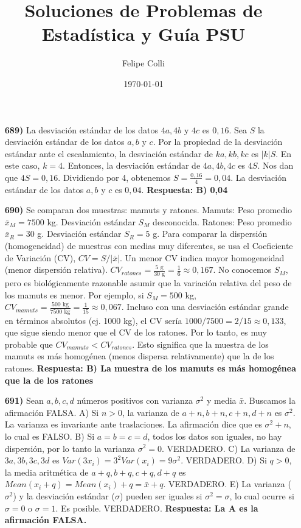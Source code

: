 \documentclass[12pt, a4paper]{article} %
\title{Soluciones de Problemas de Estadística y Guía PSU} %
\date{\today}
\author{Felipe Colli} %
\begin{document}
\maketitle

\begin{enumerate}
    \item[\bfseries 689)] La desviación estándar de los datos $4a, 4b$ y $4c$ es $0,16$. Sea $S$ la desviación estándar de los datos $a, b$ y $c$.
    Por la propiedad de la desviación estándar ante el escalamiento, la desviación estándar de $ka, kb, kc$ es $|k|S$.
    En este caso, $k=4$. Entonces, la desviación estándar de $4a, 4b, 4c$ es $4S$.
    Nos dan que $4S = 0,16$.
    Dividiendo por 4, obtenemos $S = \frac{0,16}{4} = 0,04$.
    La desviación estándar de los datos $a, b$ y $c$ es $0,04$.
    \textbf{Respuesta: B) 0,04}

    \item[\bfseries 690)] Se comparan dos muestras: mamuts y ratones.
    Mamuts: Peso promedio $\bar{x}_M = 7500$ kg. Desviación estándar $S_M$ desconocida.
    Ratones: Peso promedio $\bar{x}_R = 30$ g. Desviación estándar $S_R = 5$ g.
    Para comparar la dispersión (homogeneidad) de muestras con medias muy diferentes, se usa el Coeficiente de Variación (CV), $CV = S / |\bar{x}|$. Un menor CV indica mayor homogeneidad (menor dispersión relativa).
    $CV_{ratones} = \frac{5 \text{ g}}{30 \text{ g}} = \frac{1}{6} \approx 0,167$.
    No conocemos $S_M$, pero es biológicamente razonable asumir que la variación relativa del peso de los mamuts es menor. Por ejemplo, si $S_M = 500$ kg, $CV_{mamuts} = \frac{500 \text{ kg}}{7500 \text{ kg}} = \frac{1}{15} \approx 0,067$.
    Incluso con una desviación estándar grande en términos absolutos (ej. 1000 kg), el CV sería $1000/7500 = 2/15 \approx 0,133$, que sigue siendo menor que el CV de los ratones.
    Por lo tanto, es muy probable que $CV_{mamuts} < CV_{ratones}$. Esto significa que la muestra de los mamuts es más homogénea (menos dispersa relativamente) que la de los ratones.
    \textbf{Respuesta: B) La muestra de los mamuts es más homogénea que la de los ratones}

    \item[\bfseries 691)] Sean $a, b, c, d$ números positivos con varianza $\sigma^2$ y media $\bar{x}$. Buscamos la afirmación FALSA.
    A) Si $n > 0$, la varianza de $a+n, b+n, c+n, d+n$ es $\sigma^2$. La varianza es invariante ante traslaciones. La afirmación dice que es $\sigma^2 + n$, lo cual es FALSO.
    B) Si $a=b=c=d$, todos los datos son iguales, no hay dispersión, por lo tanto la varianza $\sigma^2 = 0$. VERDADERO.
    C) La varianza de $3a, 3b, 3c, 3d$ es $Var(3x_i) = 3^2 Var(x_i) = 9\sigma^2$. VERDADERO.
    D) Si $q > 0$, la media aritmética de $a+q, b+q, c+q, d+q$ es $Mean(x_i+q) = Mean(x_i) + q = \bar{x} + q$. VERDADERO.
    E) La varianza ($\sigma^2$) y la desviación estándar ($\sigma$) pueden ser iguales si $\sigma^2 = \sigma$, lo cual ocurre si $\sigma=0$ o $\sigma=1$. Es posible. VERDADERO.
\textbf{Respuesta: La A es la afirmación FALSA.}


\end{enumerate}
\end{document}
